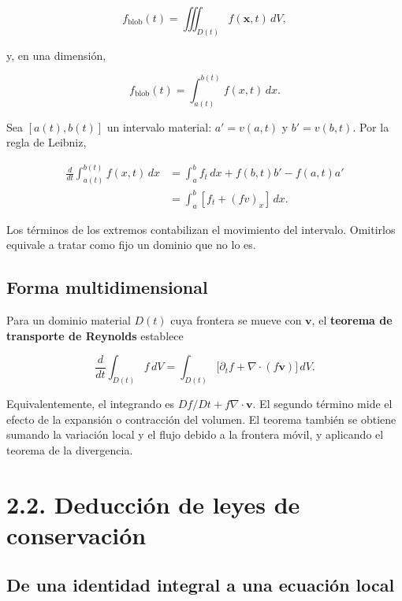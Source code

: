 \documentclass[11pt,a4paper]{article}
\begin{document}
\[f_{\mathrm{blob}}(t)=\iiint_{D(t)}f(\mathbf x,t)\,dV,\tag{2.6}\]

y, en una dimensión,

\[f_{\mathrm{blob}}(t)=\int_{a(t)}^{b(t)}f(x,t)\,dx.\tag{2.7}\]

Sea \([a(t),b(t)]\) un intervalo material: \(a'=v(a,t)\) y
\(b'=v(b,t)\). Por la regla de Leibniz,

\[\begin{aligned}
\frac{d}{dt}\int_{a(t)}^{b(t)} f(x,t)\,dx
&=\int_a^b f_t\,dx+f(b,t)b'-f(a,t)a'\\
&=\int_a^b\left[f_t+(fv)_x\right]\,dx.
\end{aligned}\tag{2.8}\]

Los términos de los extremos contabilizan el movimiento del intervalo.
Omitirlos equivale a tratar como fijo un dominio que no lo es.

\hypertarget{forma-multidimensional}{%
\subsection{Forma multidimensional}\label{forma-multidimensional}}

Para un dominio material \(D(t)\) cuya frontera se mueve con
\(\mathbf v\), el \textbf{teorema de transporte de Reynolds} establece

\[\boxed{\frac{d}{dt}\int_{D(t)} f\,dV=\int_{D(t)}\bigl[\partial_t f+\nabla\cdot(f\mathbf v)\bigr]\,dV.}\tag{2.9}\]

Equivalentemente, el integrando es \(Df/Dt+f\nabla\cdot\mathbf v\). El
segundo término mide el efecto de la expansión o contracción del
volumen. El teorema también se obtiene sumando la variación local y el
flujo debido a la frontera móvil, y aplicando el teorema de la
divergencia.

\hypertarget{deducciuxf3n-de-leyes-de-conservaciuxf3n}{%
\section{2.2. Deducción de leyes de
conservación}\label{deducciuxf3n-de-leyes-de-conservaciuxf3n}}

\hypertarget{de-una-identidad-integral-a-una-ecuaciuxf3n-local}{%
\subsection{De una identidad integral a una ecuación
local}\label{de-una-identidad-integral-a-una-ecuaciuxf3n-local}}
\end{document}
